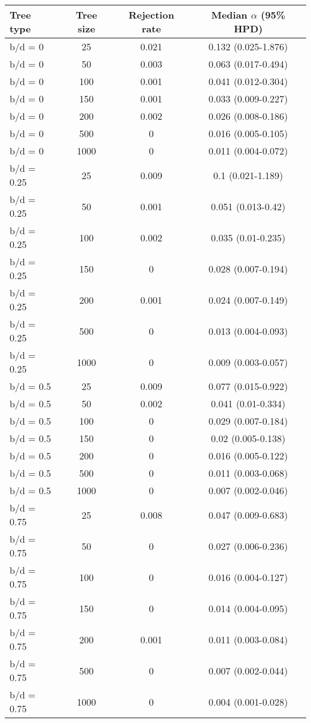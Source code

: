\begin{tabular}{lccc}
     \hline
     \textbf{Tree type} & \textbf{Tree size} & \textbf{Rejection rate}  & \textbf{Median $\alpha$ (95\% HPD)}    \\
     \hline
b/d = 0   &    25   &    0.021     &    0.132 (0.025-1.876) \\
b/d = 0   &    50   &    0.003     &    0.063 (0.017-0.494) \\
b/d = 0   &    100  &    0.001     &    0.041 (0.012-0.304) \\
b/d = 0   &    150  &    0.001     &    0.033 (0.009-0.227) \\
b/d = 0   &    200  &    0.002     &    0.026 (0.008-0.186) \\
b/d = 0   &    500  &    0    &    0.016 (0.005-0.105) \\
b/d = 0   &    1000 &    0    &    0.011 (0.004-0.072) \\
b/d = 0.25     &    25   &    0.009     &    0.1 (0.021-1.189)   \\
b/d = 0.25     &    50   &    0.001     &    0.051 (0.013-0.42)  \\
b/d = 0.25     &    100  &    0.002     &    0.035 (0.01-0.235)  \\
b/d = 0.25     &    150  &    0    &    0.028 (0.007-0.194) \\
b/d = 0.25     &    200  &    0.001     &    0.024 (0.007-0.149) \\
b/d = 0.25     &    500  &    0    &    0.013 (0.004-0.093) \\
b/d = 0.25     &    1000 &    0    &    0.009 (0.003-0.057) \\
b/d = 0.5 &    25   &    0.009     &    0.077 (0.015-0.922) \\
b/d = 0.5 &    50   &    0.002     &    0.041 (0.01-0.334)  \\
b/d = 0.5 &    100  &    0    &    0.029 (0.007-0.184) \\
b/d = 0.5 &    150  &    0    &    0.02 (0.005-0.138)  \\
b/d = 0.5 &    200  &    0    &    0.016 (0.005-0.122) \\
b/d = 0.5 &    500  &    0    &    0.011 (0.003-0.068) \\
b/d = 0.5 &    1000 &    0    &    0.007 (0.002-0.046) \\
b/d = 0.75     &    25   &    0.008     &    0.047 (0.009-0.683) \\
b/d = 0.75     &    50   &    0    &    0.027 (0.006-0.236) \\
b/d = 0.75     &    100  &    0    &    0.016 (0.004-0.127) \\
b/d = 0.75     &    150  &    0    &    0.014 (0.004-0.095) \\
b/d = 0.75     &    200  &    0.001     &    0.011 (0.003-0.084) \\
b/d = 0.75     &    500  &    0    &    0.007 (0.002-0.044) \\
b/d = 0.75     &    1000 &    0    &    0.004 (0.001-0.028) \\
     \hline
\end{tabular}